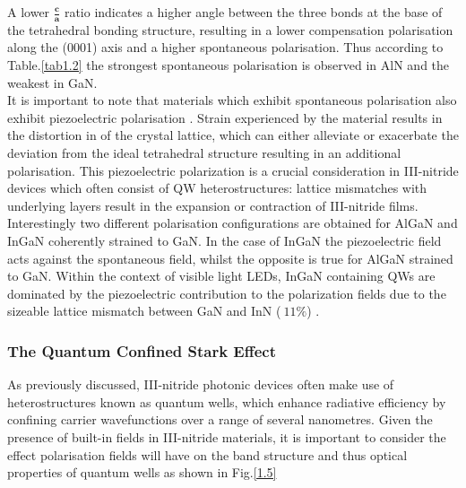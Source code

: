 A lower $\mathbf{\frac{c}{a}}$ ratio indicates a higher angle between the three bonds at the base of the tetrahedral bonding structure, resulting in a lower compensation polarisation along the (0001) axis and a higher spontaneous polarisation. Thus according to Table.\ref{tab1.2} the strongest spontaneous polarisation is observed in AlN and the weakest in GaN.\\
It is important to note that materials which exhibit spontaneous polarisation also exhibit piezoelectric polarisation \cite{Ambacher2002}. Strain experienced by the material results in the distortion in of the crystal lattice, which can either alleviate or exacerbate the deviation from the ideal tetrahedral structure resulting in an additional polarisation. This piezoelectric polarization is a crucial consideration in III-nitride devices which often consist of QW heterostructures: lattice mismatches with underlying layers result in the expansion or contraction of III-nitride films. Interestingly two different polarisation configurations are obtained for AlGaN and InGaN coherently strained to GaN. In the case of InGaN the piezoelectric field acts against the spontaneous field, whilst the opposite is true for AlGaN strained to GaN. Within the context of visible light LEDs, InGaN containing QWs are dominated by the piezoelectric contribution to the polarization fields \cite{Fiorentini1999} due to the sizeable lattice mismatch between GaN and InN ($~11\%$) \cite{Chichibu2006}.

\subsubsection{The Quantum Confined Stark Effect}

As previously discussed, III-nitride photonic devices often make use of heterostructures known as quantum wells, which enhance radiative efficiency by confining carrier wavefunctions over a range of several nanometres. Given the presence of built-in fields in III-nitride materials, it is important to consider the effect polarisation fields will have on the band structure and thus optical properties of quantum wells as shown in Fig.\ref{1.5}

